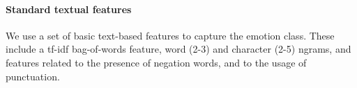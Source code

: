 \documentclass[11pt]{article}
\begin{document}


\paragraph{Standard textual features} We use a set of basic text-based features to capture the emotion class. These include a tf-idf bag-of-words feature, word (2-3) and character (2-5) ngrams, and features related to the presence of negation words, and to the usage of punctuation.


%
\end{document}
